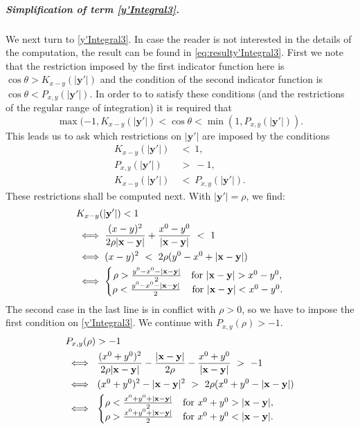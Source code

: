 \documentclass[b5paper,draft,openbib,12pt]{memoir}
\newcommand{\vx}{\mathbf{x}}
\newcommand{\vy}{\mathbf{y}}
\begin{document}
\subparagraph{Simplification of term 
\eqref{y'Integral3}.}
We next turn to \eqref{y'Integral3}. In case the reader 
is not interested in the details of the computation, 
the result can be found in \eqref{eq:resulty'Integral3}.
First we note that the restriction imposed by the first 
indicator function here is \(\cos\theta>K_{x-y}(|\vy'|)\) 
and the condition of the second indicator function is 
\(\cos\theta<P_{x,y}(|\vy'|)\). In order to to satisfy 
these conditions (and the restrictions of the regular 
range of integration) it is required that
\begin{equation}
    \max(-1,K_{x-y}(|\vy'|)<\cos\theta<\min(1,P_{x,y}(|\vy'|)).
\end{equation}
This leads us to ask which restrictions on \(|\vy'|\) 
are imposed by the conditions
\begin{align}
    K_{x-y}(|\vy'|) ~&<~1,\\
    P_{x,y}(|\vy'|) ~&>~-1,\\
    K_{x-y}(|\vy'|) ~&<~ P_{x,y}(|\vy'|).
\end{align}
These restrictions shall be computed next. With 
\(|\vy'|=\rho\), we find:
\begin{align}\notag
     &K_{x-y}(|\vy'|)<1\\
    &\iff \frac{(x-y)^2}{2\rho|\vx-\vy|}+\frac{x^0-y^0}{|\vx-\vy|}~<~1\nonumber\\
 &\iff    (x-y)^2~<~2\rho(y^0-x^0+|\vx-\vy|)\nonumber\\
   &\iff  \left\{\begin{matrix}\rho>\frac{y^0-x^0-|\vx-\vy|}{2}\quad \text{for } |\vx-\vy|>x^0-y^0,\\
\rho<\frac{y^0-x^0-|\vx-\vy|}{2}\quad \, \text{for } |\vx-\vy|<x^0-y^0.
     \end{matrix} \right.
\end{align}
The second case in the last line is in conflict with 
\(\rho>0\), so we have to impose the first condition on 
\eqref{y'Integral3}. We continue with 
\(P_{x,y}(\rho)>-1\).
\begin{align}\notag
    &P_{x,y}(\rho)>-1\\
    &\iff~ \frac{(x^0+y^0)^2}{2\rho|\vx-\vy|} - \frac{|\vx-\vy|}{2\rho}-\frac{x^0+y^0}{|\vx-\vy|} ~>~-1 \nonumber \\
   &\iff~ (x^0+y^0)^2-|\vx-\vy|^2~>~2\rho(x^0+y^0-|\vx-\vy|)\nonumber \\
    &\iff~\left\{\begin{matrix}\rho< \frac{x^0+y^0+|\vx-\vy|}{2} \quad \text{for } x^0+y^0>|\vx-\vy|,\\
    \rho> \frac{x^0+y^0+|\vx-\vy|}{2} \quad \text{for } x^0+y^0<|\vx-\vy|.
    \end{matrix} \right.
\end{align}
\end{document}
